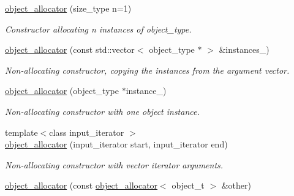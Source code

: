 \begin{DoxyCompactItemize}
\item 
\hypertarget{a00389_ab76b2fdc40e6574189de814710e4a921}{}\hyperlink{a00389_ab76b2fdc40e6574189de814710e4a921}{object\+\_\+allocator} (size\+\_\+type n=1)\label{a00389_ab76b2fdc40e6574189de814710e4a921}

\begin{DoxyCompactList}\small\item\em Constructor allocating n instances of object\+\_\+type. \end{DoxyCompactList}\item 
\hypertarget{a00389_a19b40b31f7f54ece58227f0c7c273803}{}\hyperlink{a00389_a19b40b31f7f54ece58227f0c7c273803}{object\+\_\+allocator} (const std\+::vector$<$ object\+\_\+type $\ast$ $>$ \&instances\+\_\+)\label{a00389_a19b40b31f7f54ece58227f0c7c273803}

\begin{DoxyCompactList}\small\item\em Non-\/allocating constructor, copying the instances from the argument vector. \end{DoxyCompactList}\item 
\hypertarget{a00389_ab0e10469f28b8fd054ca50546eb0e803}{}\hyperlink{a00389_ab0e10469f28b8fd054ca50546eb0e803}{object\+\_\+allocator} (object\+\_\+type $\ast$instance\+\_\+)\label{a00389_ab0e10469f28b8fd054ca50546eb0e803}

\begin{DoxyCompactList}\small\item\em Non-\/allocating constructor with one object instance. \end{DoxyCompactList}\item 
\hypertarget{a00389_adf4400eae7f1b94db68a106430d02966}{}{\footnotesize template$<$class input\+\_\+iterator $>$ }\\\hyperlink{a00389_adf4400eae7f1b94db68a106430d02966}{object\+\_\+allocator} (input\+\_\+iterator start, input\+\_\+iterator end)\label{a00389_adf4400eae7f1b94db68a106430d02966}

\begin{DoxyCompactList}\small\item\em Non-\/allocating constructor with vector iterator arguments. \end{DoxyCompactList}\item 
\hypertarget{a00389_a91c8cc717981b5a6ffa9cc3d808b94eb}{}\hyperlink{a00389_a91c8cc717981b5a6ffa9cc3d808b94eb}{object\+\_\+allocator} (const \hyperlink{a00389}{object\+\_\+allocator}$<$ object\+\_\+t $>$ \&other)\label{a00389_a91c8cc717981b5a6ffa9cc3d808b94eb}


\end{DoxyCompactItemize}
